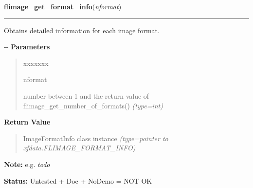     \label{xformslib:flflimage:flimage_get_format_info}

    \vspace{0.5ex}

\hspace{.8\funcindent}\begin{boxedminipage}{\funcwidth}

    \raggedright \textbf{flimage\_get\_format\_info}(\textit{nformat})

    \vspace{-1.5ex}

    \rule{\textwidth}{0.5\fboxrule}
\setlength{\parskip}{2ex}

Obtains detailed information for each image format.

-{}-
\setlength{\parskip}{1ex}
      \textbf{Parameters}
      \vspace{-1ex}

      \begin{quote}
        \begin{Ventry}{xxxxxxx}

          \item[nformat]


number between 1 and the return value of
flimage\_get\_number\_of\_formats()
            {\it (type=int)}

        \end{Ventry}

      \end{quote}

      \textbf{Return Value}
    \vspace{-1ex}

      \begin{quote}

ImageFormatInfo class instance
      {\it (type=pointer to xfdata.FLIMAGE\_FORMAT\_INFO)}

      \end{quote}

\textbf{Note:} 
e.g. \emph{todo}


\textbf{Status:} 
Untested + Doc + NoDemo = NOT OK


    \end{boxedminipage}

    \label{xformslib:flflimage:fl_get_matrix}

